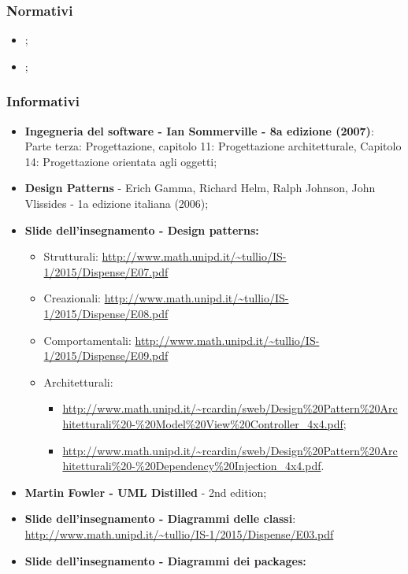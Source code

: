 \subsubsection{Normativi}
\begin{itemize}
	\item \textit{\NdPv};
	\item \textit{\AdRvDue};
\end{itemize}
\subsubsection{Informativi}
\begin{itemize}
	\item \textbf{Ingegneria del software - Ian Sommerville - 8a edizione (2007)}: \\
	Parte terza: Progettazione, capitolo 11: Progettazione architetturale, Capitolo 14: Progettazione orientata agli oggetti;
	\item \textbf{Design Patterns} - Erich Gamma, Richard Helm, Ralph Johnson, John Vlissides - 1a edizione italiana (2006);
	\item \textbf{Slide dell'insegnamento - Design patterns:}
	\begin{itemize}
		\item Strutturali: \url{http://www.math.unipd.it/~tullio/IS-1/2015/Dispense/E07.pdf}
		\item Creazionali: \url{http://www.math.unipd.it/~tullio/IS-1/2015/Dispense/E08.pdf}
		\item Comportamentali: \url{http://www.math.unipd.it/~tullio/IS-1/2015/Dispense/E09.pdf}
		\item Architetturali:
			\begin{itemize}
				\item \url{http://www.math.unipd.it/~rcardin/sweb/Design%20Pattern%20Architetturali%20-%20Model%20View%20Controller_4x4.pdf};
				\item \url{http://www.math.unipd.it/~rcardin/sweb/Design%20Pattern%20Architetturali%20-%20Dependency%20Injection_4x4.pdf}.
			\end{itemize} 
	\end{itemize}
	\item \textbf{Martin Fowler - UML Distilled} - 2nd edition;
	\item \textbf{Slide dell'insegnamento - Diagrammi delle classi}: \\
		\url{http://www.math.unipd.it/~tullio/IS-1/2015/Dispense/E03.pdf}
	\item \textbf{Slide dell'insegnamento - Diagrammi dei packages:} \\

\end{itemize}

